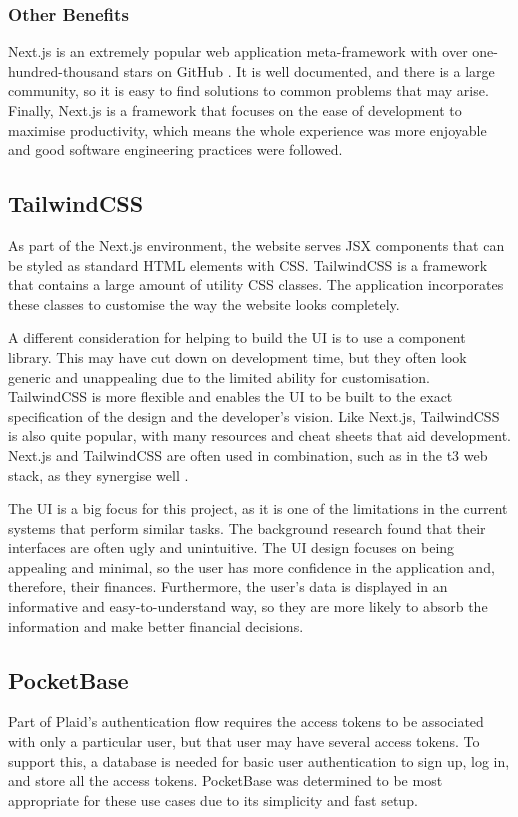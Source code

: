 \subsubsection{Other Benefits}
Next.js is an extremely popular web application meta-framework with over one-hundred-thousand stars on GitHub \cite{NextGitHub}. It is well documented, and there is a large community, so it is easy to find solutions to common problems that may arise. Finally, Next.js is a framework that focuses on the ease of development to maximise productivity, which means the whole experience was more enjoyable and good software engineering practices were followed.

\subsection{TailwindCSS}
As part of the Next.js environment, the website serves JSX components that can be styled as standard HTML elements with CSS. TailwindCSS is a framework that contains a large amount of utility CSS classes. The application incorporates these classes to customise the way the website looks completely.

A different consideration for helping to build the UI is to use a component library. This may have cut down on development time, but they often look generic and unappealing due to the limited ability for customisation. TailwindCSS is more flexible and enables the UI to be built to the exact specification of the design and the developer's vision. Like Next.js, TailwindCSS is also quite popular, with many resources and cheat sheets that aid development. Next.js and TailwindCSS are often used in combination, such as in the t3 web stack, as they synergise well \cite{T3Stack}.

The UI is a big focus for this project, as it is one of the limitations in the current systems that perform similar tasks. The background research found that their interfaces are often ugly and unintuitive. The UI design focuses on being appealing and minimal, so the user has more confidence in the application and, therefore, their finances. Furthermore, the user's data is displayed in an informative and easy-to-understand way, so they are more likely to absorb the information and make better financial decisions.

\subsection{PocketBase}
Part of Plaid's authentication flow requires the access tokens to be associated with only a particular user, but that user may have several access tokens. To support this, a database is needed for basic user authentication to sign up, log in, and store all the access tokens. PocketBase was determined to be most appropriate for these use cases due to its simplicity and fast setup.

